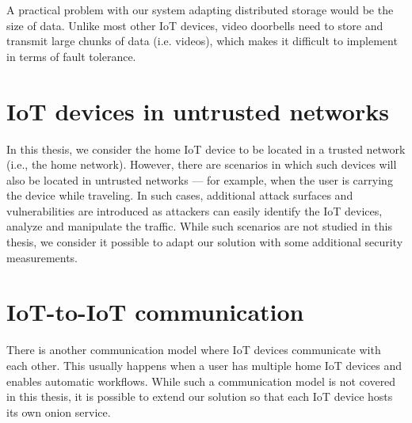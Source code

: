 A practical problem with our system adapting distributed storage would be the size of data. Unlike most other IoT devices, video doorbells need to store and transmit large chunks of data (i.e. videos), which makes it difficult to implement in terms of fault tolerance.


\section{IoT devices in untrusted networks}
In this thesis, we consider the home IoT device to be located in a trusted network (i.e., the home network). However, there are scenarios in which such devices will also be located in untrusted networks — for example, when the user is carrying the device while traveling. In such cases, additional attack surfaces and vulnerabilities are introduced as attackers can easily identify the IoT devices, analyze and manipulate the traffic. While such scenarios are not studied in this thesis, we consider it possible to adapt our solution with some additional security measurements. 

\section{IoT-to-IoT communication}
There is another communication model where IoT devices communicate with each other. This usually happens when a user has multiple home IoT devices and enables automatic workflows. While such a communication model is not covered in this thesis, it is possible to extend our solution so that each IoT device hosts its own onion service.